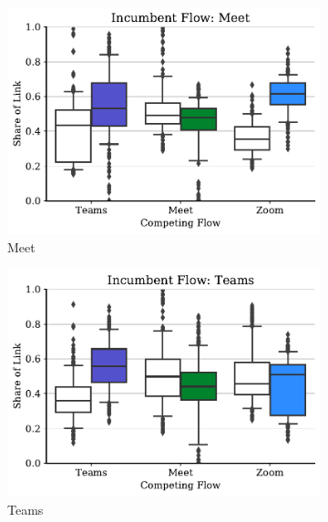 \begin{figure}[t!]
    \centering
    \begin{subfigure}[t]{.33\textwidth}
        \centering
        \includegraphics[width=1\textwidth]{figures/comp_all/box_plot_meet_ul_0.5_all.pdf}
        \caption{Meet}
        \label{fig:meet_ul_box}
    \end{subfigure}\hfill
    \begin{subfigure}[t]{.33\textwidth}
        \centering
        \includegraphics[width=1\textwidth]{figures/comp_all/box_plot_teams_ul_0.5_all.pdf}
        \caption{Teams}
        \label{fig:teams_ul_box}
    \end{subfigure}
    \begin{subfigure}[t]{.33\textwidth}
        \centering

\end{subfigure}
\end{figure}
